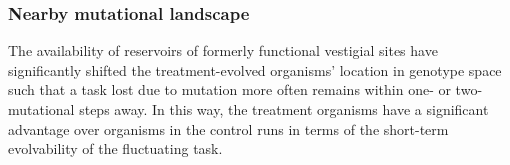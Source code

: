 \subsubsection{Nearby mutational landscape}

The availability of reservoirs of formerly functional vestigial sites have significantly shifted the treatment-evolved organisms' location in genotype space such that a task lost due to mutation more often remains within one- or two-mutational steps away. In this way, the treatment organisms have a significant advantage over organisms in the control runs in terms of the short-term evolvability of the fluctuating task.



